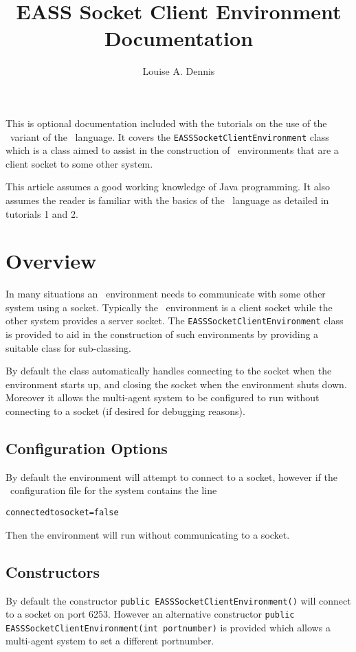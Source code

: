 \documentclass[a4]{article}
\author{Louise A. Dennis}
\title{EASS Socket Client Environment Documentation}
\begin{document}
\maketitle
\begin{sloppypar}
This is optional documentation included with the tutorials on the use of the \eass\ variant of the \gwendolen\ language.  It covers the \texttt{EASSSocketClientEnvironment} class which is a class aimed to assist in the construction of \eass\ environments that are a client socket to some other system.
\end{sloppypar}

This article assumes a good working knowledge of Java programming. It also assumes the reader is familiar with the basics of the \eass\ language as detailed in tutorials 1 and 2.

\section{Overview}
\begin{sloppypar}
In many situations an \eass\ environment needs to communicate with some other system using a socket.  Typically the \eass\ environment is a client socket while the other system provides a server socket.  The \texttt{EASSSocketClientEnvironment} class is provided to aid in the construction of such environments by providing a suitable class for sub-classing.
\end{sloppypar}

By default the class automatically handles connecting to the socket when the environment starts up, and closing the socket when the environment shuts down.  Moreover it allows the multi-agent system to be configured to run without connecting to a socket (if desired for debugging reasons).

\subsection{Configuration Options}
By default the environment will attempt to connect to a socket, however if the \ail\ configuration file for the system contains the line
\begin{verbatim}
connectedtosocket=false
\end{verbatim}
Then the environment will run without communicating to a socket.

\subsection{Constructors}
By default the constructor \texttt{public EASSSocketClientEnvironment()} will connect to a socket on port 6253.  However an alternative constructor \texttt{public EASSSocketClientEnvironment(int portnumber)} is provided which allows a multi-agent system to set a different portnumber.
\end{document}
